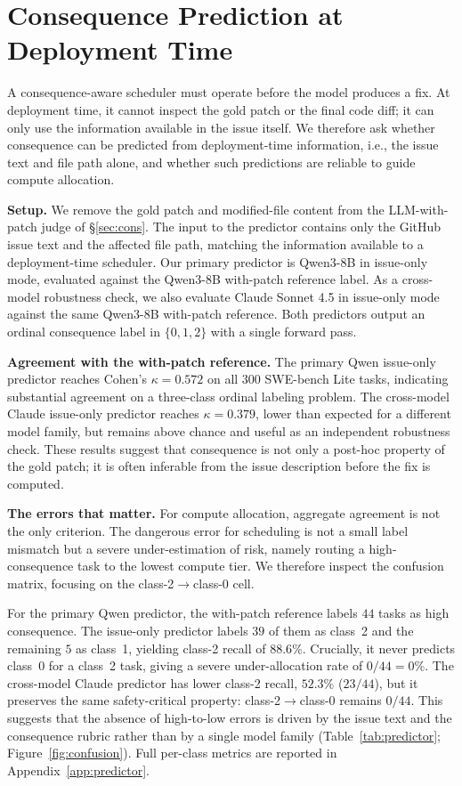 \documentclass{article}
\begin{document}
\section{Consequence Prediction at Deployment Time}
\label{sec:pred}

A consequence-aware scheduler must operate before the model produces a
fix. At deployment time, it cannot inspect the gold patch or the final
code diff; it can only use the information available in the issue
itself. We therefore ask whether consequence can be predicted from deployment-time
information, i.e., the
issue text and file path alone, and whether such predictions are reliable to guide compute allocation.

\textbf{Setup.} We remove the gold patch and modified-file content from the LLM-with-patch judge of \S\ref{sec:cons}. The input to the predictor contains only the GitHub issue text and the affected file path, matching the information available to a deployment-time scheduler. Our primary predictor is Qwen3-8B in issue-only mode, evaluated against the Qwen3-8B with-patch reference label. As a cross-model robustness check, we also evaluate Claude Sonnet 4.5 in
issue-only mode against the same Qwen3-8B with-patch reference. Both predictors output an ordinal consequence label in $\{0,1,2\}$ with a single forward pass.

\textbf{Agreement with the with-patch reference.} The primary Qwen
issue-only predictor reaches Cohen's $\kappa = 0.572$ on all $300$ SWE-bench Lite tasks, indicating substantial agreement on a three-class ordinal labeling problem. The cross-model Claude issue-only predictor reaches $\kappa = 0.379$, lower than expected for a
different model family, but remains above chance and useful as an independent robustness check. These results suggest that consequence is not only a post-hoc property of the gold patch; it is often inferable from the issue description before the fix is computed.

\textbf{The errors that matter.} For compute allocation, aggregate agreement is not the only criterion. The dangerous error for scheduling is not a small
label mismatch but a severe under-estimation of risk, namely routing a
high-consequence task to the lowest compute tier. We therefore inspect
the confusion matrix, focusing on the class-2$\to$class-0 cell.

For the primary Qwen predictor, the with-patch reference labels $44$ tasks as high consequence. The issue-only predictor labels $39$ of them as class~2 and the remaining $5$ as class~1, yielding class-2
recall of $88.6\%$. Crucially, it never predicts class~0 for a class~2 task, giving a severe under-allocation rate of
$0/44 = 0\%$. The cross-model Claude predictor has lower class-2
recall, $52.3\%$ ($23/44$), but it preserves the same safety-critical
property: class-2$\to$class-0 remains $0/44$. This suggests that the
absence of high-to-low errors is driven by the issue text and the
consequence rubric rather than by a single model family (Table~\ref{tab:predictor}; Figure~\ref{fig:confusion}). Full per-class metrics are reported in Appendix~\ref{app:predictor}.
\end{document}
